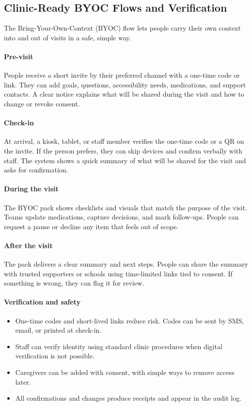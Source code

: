 \documentclass[12pt]{article}
\begin{document}
\subsection*{Clinic-Ready BYOC Flows and Verification}
The Bring-Your-Own-Context (BYOC) flow lets people carry their own context into and out of visits in a safe, simple way.

\paragraph{Pre-visit}
People receive a short invite by their preferred channel with a one-time code or link. They can add goals, questions, accessibility needs, medications, and support contacts. A clear notice explains what will be shared during the visit and how to change or revoke consent.

\paragraph{Check-in}
At arrival, a kiosk, tablet, or staff member verifies the one-time code or a QR on the invite. If the person prefers, they can skip devices and confirm verbally with staff. The system shows a quick summary of what will be shared for the visit and asks for confirmation.

\paragraph{During the visit}
The BYOC pack shows checklists and visuals that match the purpose of the visit. Teams update medications, capture decisions, and mark follow-ups. People can request a pause or decline any item that feels out of scope.

\paragraph{After the visit}
The pack delivers a clear summary and next steps. People can share the summary with trusted supporters or schools using time-limited links tied to consent. If something is wrong, they can flag it for review.

\paragraph{Verification and safety}
\begin{itemize}[leftmargin=*]
  \item One-time codes and short-lived links reduce risk. Codes can be sent by SMS, email, or printed at check-in.
  \item Staff can verify identity using standard clinic procedures when digital verification is not possible.
  \item Caregivers can be added with consent, with simple ways to remove access later.
  \item All confirmations and changes produce receipts and appear in the audit log.
\end{itemize}
\end{document}
